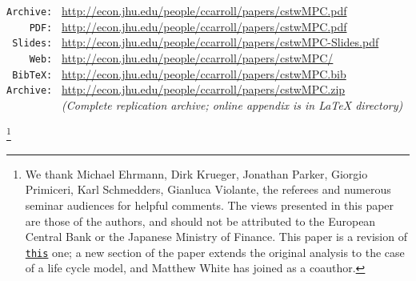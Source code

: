 \documentclass[12pt,titlepage]{econtex}
\begin{document}
\begin{small}
\parbox{\textwidth}{
\begin{center}
\begin{tabbing}
\texttt{Archive:~} \= \= \url{http://econ.jhu.edu/people/ccarroll/papers/cstwMPC.pdf} \kill \\  %
\texttt{~~~~PDF:~} \> \> \url{http://econ.jhu.edu/people/ccarroll/papers/cstwMPC.pdf} \\
\texttt{~Slides:~} \> \> \url{http://econ.jhu.edu/people/ccarroll/papers/cstwMPC-Slides.pdf} \\
\texttt{~~~~Web:~} \> \> \url{http://econ.jhu.edu/people/ccarroll/papers/cstwMPC/} \\
\texttt{~BibTeX:~} \> \> \url{http://econ.jhu.edu/people/ccarroll/papers/cstwMPC.bib} \\
\texttt{Archive:~} \> \> \url{http://econ.jhu.edu/people/ccarroll/papers/cstwMPC.zip} 
\\\texttt{~~~~~~~~~} \> \> {\it (Complete replication archive; online appendix is in LaTeX directory)}
\end{tabbing}
\end{center}
}
\end{small}

\begin{authorsinfo}
\end{authorsinfo}



\thanks{We thank Michael Ehrmann, Dirk Krueger, Jonathan Parker, Giorgio Primiceri, Karl Schmedders, Gianluca Violante, the referees and numerous seminar audiences for helpful comments. The views presented in this paper are those of the authors, and should not be attributed to the European Central Bank or the Japanese Ministry of Finance.  This paper is a revision of \href{https://www.ecb.europa.eu/pub/pdf/scpwps/ecbwp1655.pdf}{\texttt{this}} one; a new section of the paper extends the original analysis to the case of a life cycle model, and Matthew White has joined as a coauthor.}
\end{document}
